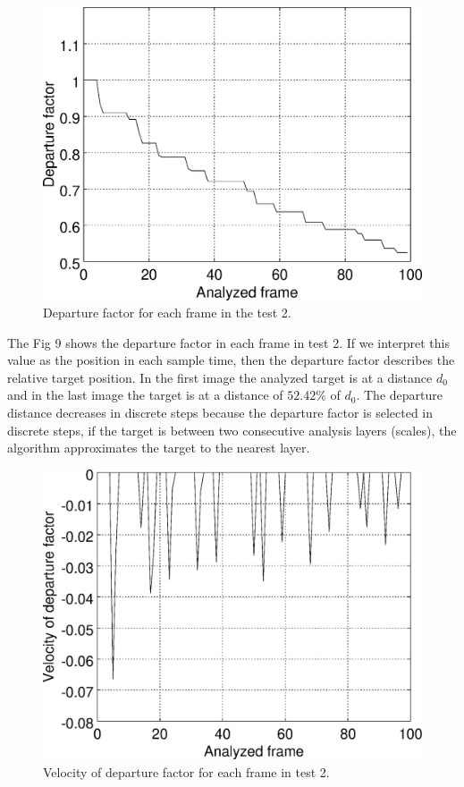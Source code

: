 \begin{figure}[!hbt]
\includegraphics[width=\columnwidth]{images/graph2.eps}
\caption{Departure factor for each frame in the test 2.}
\label{fig:res_graph2}
\end{figure}
The Fig 9 shows the departure factor in each frame
in test 2. If we interpret this value as the position in each sample time, 
then the departure factor describes the relative target position.
In the first image the analyzed target is at a distance $d_0$ 
and in the last image the target is at a distance of $52.42\%$ of $d_0$.
The departure distance decreases in discrete steps because the departure
factor is selected in discrete steps, if the target is
between two consecutive analysis layers (scales), the algorithm
approximates the target to the nearest layer. 
\begin{figure}[!hbt]
\includegraphics[width=\columnwidth]{images/graph2v.eps}
\caption{Velocity of departure factor for each frame in test 2.}
\label{fig:res_graph2v}
\end{figure}
